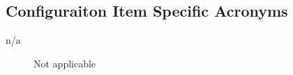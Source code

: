 \subsection{Configuraiton Item Specific Acronyms}
\begin{description}
\item[n/a] \quad Not applicable
\end{description}
